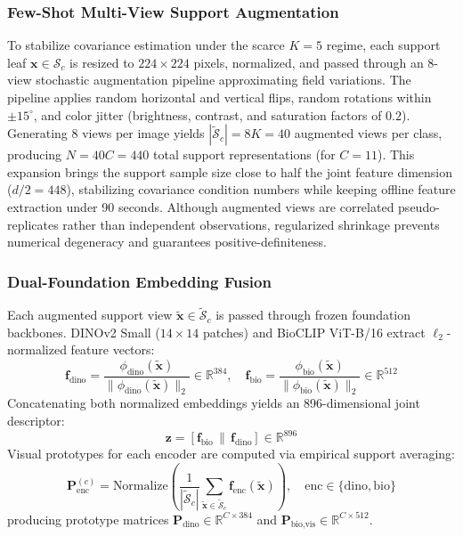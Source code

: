 \documentclass[preprint,12pt]{elsarticle}
\begin{document}
\subsubsection{Few-Shot Multi-View Support Augmentation}
To stabilize covariance estimation under the scarce $K=5$ regime, each support leaf $\mathbf{x} \in \mathcal{S}_c$ is resized to $224 \times 224$ pixels, normalized, and passed through an 8-view stochastic augmentation pipeline approximating field variations. The pipeline applies random horizontal and vertical flips, random rotations within $\pm 15^\circ$, and color jitter (brightness, contrast, and saturation factors of $0.2$). Generating 8 views per image yields $|\tilde{\mathcal{S}}_c| = 8K = 40$ augmented views per class, producing $N = 40C = 440$ total support representations (for $C=11$). This expansion brings the support sample size close to half the joint feature dimension ($d/2 = 448$), stabilizing covariance condition numbers while keeping offline feature extraction under 90 seconds. Although augmented views are correlated pseudo-replicates rather than independent observations, regularized shrinkage prevents numerical degeneracy and guarantees positive-definiteness.

\subsubsection{Dual-Foundation Embedding Fusion}
Each augmented support view $\tilde{\mathbf{x}} \in \tilde{\mathcal{S}}_c$ is passed through frozen foundation backbones. DINOv2 Small ($14\times 14$ patches) \cite{oquab2023dinov2} and BioCLIP ViT-B/16 \cite{stevens2024bioclip} extract $\ell_2$-normalized feature vectors:
\begin{equation}
    \mathbf{f}_{\text{dino}} = \frac{\phi_{\text{dino}}(\tilde{\mathbf{x}})}{\|\phi_{\text{dino}}(\tilde{\mathbf{x}})\|_2} \in \mathbb{R}^{384}, \quad
    \mathbf{f}_{\text{bio}} = \frac{\phi_{\text{bio}}(\tilde{\mathbf{x}})}{\|\phi_{\text{bio}}(\tilde{\mathbf{x}})\|_2} \in \mathbb{R}^{512}
\end{equation}
Concatenating both normalized embeddings yields an 896-dimensional joint descriptor:
\begin{equation}
    \mathbf{z} = [\mathbf{f}_{\text{bio}} \,\|\, \mathbf{f}_{\text{dino}}] \in \mathbb{R}^{896}
\end{equation}
Visual prototypes for each encoder are computed via empirical support averaging:
\begin{equation}
    \mathbf{P}_{\text{enc}}^{(c)} = \text{Normalize}\left(\frac{1}{|\tilde{\mathcal{S}}_c|}\sum_{\tilde{\mathbf{x}} \in \tilde{\mathcal{S}}_c} \mathbf{f}_{\text{enc}}(\tilde{\mathbf{x}})\right), \quad \text{enc} \in \{\text{dino}, \text{bio}\}
\end{equation}
producing prototype matrices $\mathbf{P}_{\text{dino}} \in \mathbb{R}^{C \times 384}$ and $\mathbf{P}_{\text{bio,vis}} \in \mathbb{R}^{C \times 512}$.
\end{document}
